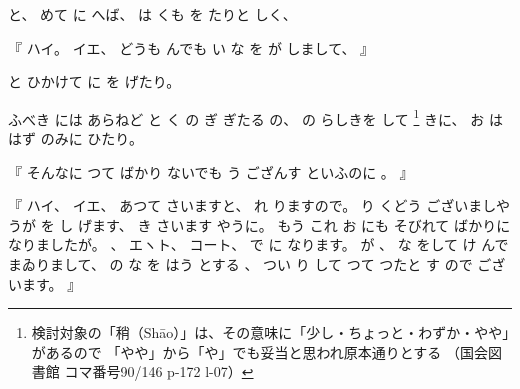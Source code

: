 %
と、
%
めて
に
へば、
%
は
くも
を
たりと
しく、

%
『
ハイ。
%
イエ、
%
どうも
んでも
い
な
を
が
しまして、
』

%
と
ひかけて
に
を
げたり。

%
ふべき
には
あらねど
と
く
の
ぎ
ぎたる
の、
%
の
らしきを
して
\footnote{%
検討対象の「稍（Shāo）」は、その意味に「少し・ちょっと・わずか・やや」があるので
「やや」から「や」でも妥当と思われ原本通りとする
（国会図書館 コマ番号90/146 p-172 l-07）
}%
きに、
%
お
は
はず
のみに
ひたり。

%
『
そんなに
つて
ばかり
ないでも
う
ござんす
といふのに
。
』

%
『
ハイ、
%
イエ、
%
あつて
さいますと、
%
れ%
りますので。
%
り
くどう
ございましやうが
を
し
げます、
%
き
さいます
やうに。
%
%
もう
これ
お
にも
そびれて
ばかりに
なりましたが。
%
、
エヽト、
%
コート、
%
で
に
なります。
%
が
、
%
な
をして
け
んで
まゐりまして、
%
の
な
を
はう
とする
、
%
つい
り
して
つて
つたと
す
ので
ございます。
』

